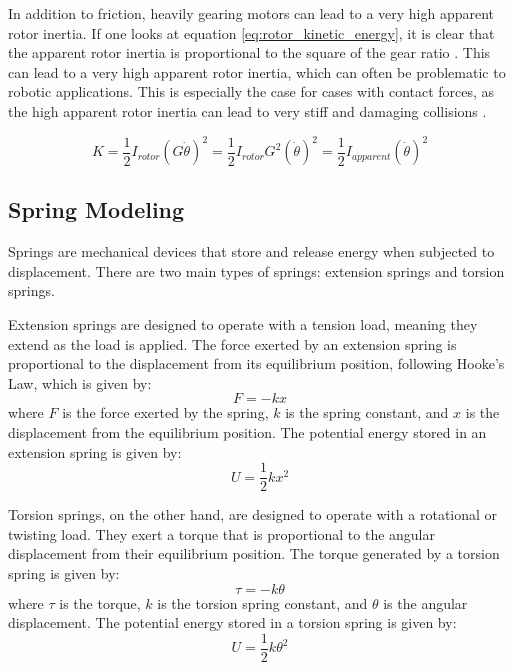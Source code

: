     In addition to friction, heavily gearing motors can lead to a very high apparent rotor inertia. If one looks at equation \ref{eq:rotor_kinetic_energy}, it is clear that the apparent rotor inertia is proportional to the square of the gear ratio \cite{modern_robotics_book}. This can lead to a very high apparent rotor inertia, which can often be problematic to robotic applications. This is especially the case for cases with contact forces, as the high apparent rotor inertia can lead to very stiff and damaging collisions \cite{proprioceptive}.

    \begin{equation}
        \label{eq:rotor_kinetic_energy}
        K = \frac{1}{2}{I}_{rotor}(G\dot\theta)^2 = \frac{1}{2}{I}_{rotor}G^2(\dot\theta)^2 = \frac{1}{2}I_{apparent}(\dot\theta)^2
    \end{equation}

\subsection{Spring Modeling}
\label{sec:spring_theory}
Springs are mechanical devices that store and release energy when subjected to displacement. There are two main types of springs: extension springs and torsion springs.

Extension springs are designed to operate with a tension load, meaning they extend as the load is applied. The force exerted by an extension spring is proportional to the displacement from its equilibrium position, following Hooke's Law, which is given by:
\begin{equation}
    F = -kx
\end{equation}
where \( F \) is the force exerted by the spring, \( k \) is the spring constant, and \( x \) is the displacement from the equilibrium position. The potential energy stored in an extension spring is given by:
\begin{equation}
    U = \frac{1}{2}kx^2
\end{equation}

Torsion springs, on the other hand, are designed to operate with a rotational or twisting load. They exert a torque that is proportional to the angular displacement from their equilibrium position. The torque generated by a torsion spring is given by:
\begin{equation}
    \tau = -k\theta
\end{equation}
where \( \tau \) is the torque, \( k \) is the torsion spring constant, and \( \theta \) is the angular displacement. The potential energy stored in a torsion spring is given by:
\begin{equation}
    U = \frac{1}{2}k\theta^2
\end{equation}

